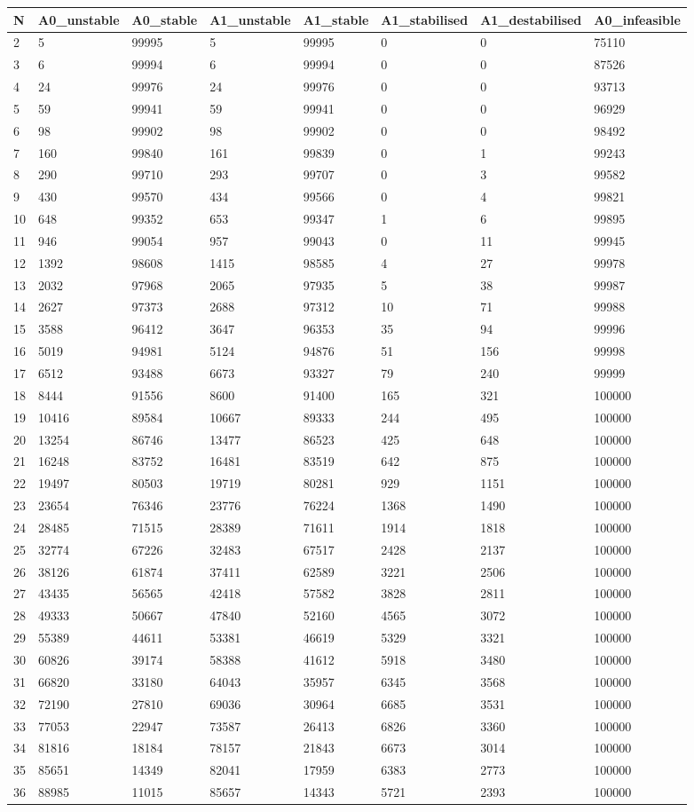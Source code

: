 \documentclass[]{article}
\begin{document}
\begin{longtable}[]{@{}llllllll@{}}
\toprule
N & A0\_unstable & A0\_stable & A1\_unstable & A1\_stable &
A1\_stabilised & A1\_destabilised & A0\_infeasible\tabularnewline
\midrule
\endhead
2 & 5 & 99995 & 5 & 99995 & 0 & 0 & 75110\tabularnewline
3 & 6 & 99994 & 6 & 99994 & 0 & 0 & 87526\tabularnewline
4 & 24 & 99976 & 24 & 99976 & 0 & 0 & 93713\tabularnewline
5 & 59 & 99941 & 59 & 99941 & 0 & 0 & 96929\tabularnewline
6 & 98 & 99902 & 98 & 99902 & 0 & 0 & 98492\tabularnewline
7 & 160 & 99840 & 161 & 99839 & 0 & 1 & 99243\tabularnewline
8 & 290 & 99710 & 293 & 99707 & 0 & 3 & 99582\tabularnewline
9 & 430 & 99570 & 434 & 99566 & 0 & 4 & 99821\tabularnewline
10 & 648 & 99352 & 653 & 99347 & 1 & 6 & 99895\tabularnewline
11 & 946 & 99054 & 957 & 99043 & 0 & 11 & 99945\tabularnewline
12 & 1392 & 98608 & 1415 & 98585 & 4 & 27 & 99978\tabularnewline
13 & 2032 & 97968 & 2065 & 97935 & 5 & 38 & 99987\tabularnewline
14 & 2627 & 97373 & 2688 & 97312 & 10 & 71 & 99988\tabularnewline
15 & 3588 & 96412 & 3647 & 96353 & 35 & 94 & 99996\tabularnewline
16 & 5019 & 94981 & 5124 & 94876 & 51 & 156 & 99998\tabularnewline
17 & 6512 & 93488 & 6673 & 93327 & 79 & 240 & 99999\tabularnewline
18 & 8444 & 91556 & 8600 & 91400 & 165 & 321 & 100000\tabularnewline
19 & 10416 & 89584 & 10667 & 89333 & 244 & 495 & 100000\tabularnewline
20 & 13254 & 86746 & 13477 & 86523 & 425 & 648 & 100000\tabularnewline
21 & 16248 & 83752 & 16481 & 83519 & 642 & 875 & 100000\tabularnewline
22 & 19497 & 80503 & 19719 & 80281 & 929 & 1151 & 100000\tabularnewline
23 & 23654 & 76346 & 23776 & 76224 & 1368 & 1490 & 100000\tabularnewline
24 & 28485 & 71515 & 28389 & 71611 & 1914 & 1818 & 100000\tabularnewline
25 & 32774 & 67226 & 32483 & 67517 & 2428 & 2137 & 100000\tabularnewline
26 & 38126 & 61874 & 37411 & 62589 & 3221 & 2506 & 100000\tabularnewline
27 & 43435 & 56565 & 42418 & 57582 & 3828 & 2811 & 100000\tabularnewline
28 & 49333 & 50667 & 47840 & 52160 & 4565 & 3072 & 100000\tabularnewline
29 & 55389 & 44611 & 53381 & 46619 & 5329 & 3321 & 100000\tabularnewline
30 & 60826 & 39174 & 58388 & 41612 & 5918 & 3480 & 100000\tabularnewline
31 & 66820 & 33180 & 64043 & 35957 & 6345 & 3568 & 100000\tabularnewline
32 & 72190 & 27810 & 69036 & 30964 & 6685 & 3531 & 100000\tabularnewline
33 & 77053 & 22947 & 73587 & 26413 & 6826 & 3360 & 100000\tabularnewline
34 & 81816 & 18184 & 78157 & 21843 & 6673 & 3014 & 100000\tabularnewline
35 & 85651 & 14349 & 82041 & 17959 & 6383 & 2773 & 100000\tabularnewline
36 & 88985 & 11015 & 85657 & 14343 & 5721 & 2393 & 100000\tabularnewline

\end{longtable}
\end{document}
